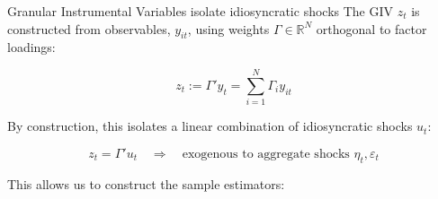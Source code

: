 \documentclass[aspectratio=169,11pt]{beamer}
\begin{document}
\begin{frame}{Granular Instrumental Variables isolate idiosyncratic shocks}
    \vspace{0.2cm}
    \centering
    The GIV $z_t$ is constructed from observables, $y_{it}$, using weights $\Gamma \in \mathbb{R}^N$ orthogonal to factor loadings:
    
    \vspace{0.1cm}
    \begin{equation*}
        z_t := \Gamma' y_t = \sum_{i=1}^{N} \Gamma_i y_{it}
    \end{equation*}
    
    \vspace{0.1cm}
    By construction, this isolates a linear combination of idiosyncratic shocks $u_t$:
    
    \vspace{0.1cm}
    \begin{equation*}
        z_t = \Gamma' u_t \quad \Rightarrow \quad \text{exogenous to aggregate shocks } \eta_t, \varepsilon_t
    \end{equation*}

    \vspace{0.2cm}
    This allows us to construct the sample estimators:
    \vspace{0.1cm}
    
\end{frame}
\end{document}
